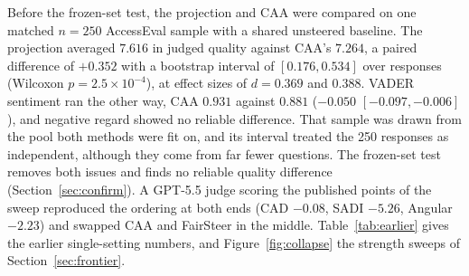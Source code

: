 Before the frozen-set test, the projection and CAA were compared on one matched $n{=}250$
AccessEval sample with a shared unsteered baseline. The projection averaged $7.616$ in
judged quality against CAA's $7.264$, a paired difference of $+0.352$ with a bootstrap
interval of $[0.176, 0.534]$ over responses (Wilcoxon $p = 2.5 \times 10^{-4}$), at
effect sizes of $d{=}0.369$ and $0.388$. VADER sentiment ran the other way, CAA $0.931$
against $0.881$ ($-0.050$ $[-0.097, -0.006]$), and negative regard showed no reliable
difference. That sample was drawn from the pool both methods were fit on, and its interval
treated the 250 responses as independent, although they come from far fewer questions.
The frozen-set test removes both issues and finds no reliable quality difference
(Section~\ref{sec:confirm}). A GPT-5.5 judge scoring the published points of the sweep reproduced the ordering at both ends
(CAD $-0.08$, SADI $-5.26$, Angular $-2.23$) and swapped CAA and FairSteer in the middle.
Table~\ref{tab:earlier} gives the earlier single-setting numbers, and
Figure~\ref{fig:collapse} the strength sweeps of Section~\ref{sec:frontier}.


